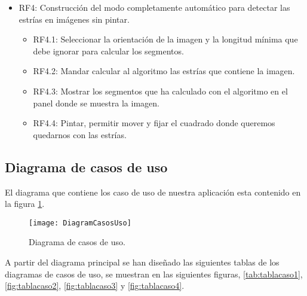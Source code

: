 \begin{itemize}
\item RF4: Construcción del modo completamente automático para detectar las estrías en imágenes sin pintar.
	\begin{itemize}
		\item RF4.1: Seleccionar la orientación de la imagen y la longitud mínima que debe ignorar para calcular los segmentos. 
		\item RF4.2: Mandar calcular al algoritmo las estrías que contiene la imagen.
		\item RF4.3: Mostrar los segmentos que ha calculado con el algoritmo en el panel donde se muestra la imagen.					
		\item RF4.4: Pintar, permitir mover y fijar el cuadrado donde queremos quedarnos con las estrías.
	\end{itemize}
\end{itemize}					

\subsection{Diagrama de casos de uso}
El diagrama que contiene los caso de uso de nuestra aplicación esta contenido en la figura \ref{fig:diagramCasosUso}.	



\begin{figure}[h]
\centering
\texttt{[image: DiagramCasosUso]}
\caption{Diagrama de casos de uso.}
\label{fig:diagramCasosUso}
\end{figure}
 
A partir del diagrama principal se han diseñado las siguientes tablas de los diagramas de casos de uso, se muestran en las siguientes figuras, \ref{tab:tablacaso1}, \ref{fig:tablacaso2}, \ref{fig:tablacaso3} y \ref{fig:tablacaso4}.

